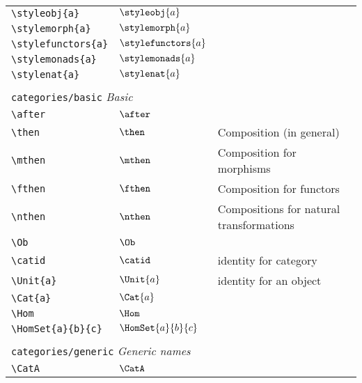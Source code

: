 \begin{longtable}{lll}
 \hline
{\color[rgb]{0.5,0.5,0.5}\texttt{\textbackslash styleobj\{a\}}} & $\styleobj{a}$ & \\ 
 {\color[rgb]{0.5,0.5,0.5}\texttt{\textbackslash stylemorph\{a\}}} & $\stylemorph{a}$ & \\ 
 {\color[rgb]{0.5,0.5,0.5}\texttt{\textbackslash stylefunctors\{a\}}} & $\stylefunctors{a}$ & \\ 
 {\color[rgb]{0.5,0.5,0.5}\texttt{\textbackslash stylemonads\{a\}}} & $\stylemonads{a}$ & \\ 
 {\color[rgb]{0.5,0.5,0.5}\texttt{\textbackslash stylenat\{a\}}} & $\stylenat{a}$ & \\ 
  &  & \\ 
 \multicolumn{3}{l}{{\color[rgb]{0.5,0.5,0.5}\texttt{categories/basic}} \emph{Basic}}\\ 
 \hline
{\color[rgb]{0.5,0.5,0.5}\texttt{\textbackslash after}} & $\after$ & \\ 
 {\color[rgb]{0.5,0.5,0.5}\texttt{\textbackslash then}} & $\then$ &  Composition (in general)\\ 
 {\color[rgb]{0.5,0.5,0.5}\texttt{\textbackslash mthen}} & $\mthen$ &  Composition for morphisms\\ 
 {\color[rgb]{0.5,0.5,0.5}\texttt{\textbackslash fthen}} & $\fthen$ &  Composition for functors\\ 
 {\color[rgb]{0.5,0.5,0.5}\texttt{\textbackslash nthen}} & $\nthen$ &  Compositions for natural transformations\\ 
 {\color[rgb]{0.5,0.5,0.5}\texttt{\textbackslash Ob}} & $\Ob$ & \\ 
 {\color[rgb]{0.5,0.5,0.5}\texttt{\textbackslash catid}} & $\catid$ &  identity for category\\ 
 {\color[rgb]{0.5,0.5,0.5}\texttt{\textbackslash Unit\{a\}}} & $\Unit{a}$ &  identity for an object\\ 
 {\color[rgb]{0.5,0.5,0.5}\texttt{\textbackslash Cat\{a\}}} & $\Cat{a}$ & \\ 
 {\color[rgb]{0.5,0.5,0.5}\texttt{\textbackslash Hom}} & $\Hom$ & \\ 
 {\color[rgb]{0.5,0.5,0.5}\texttt{\textbackslash HomSet\{a\}\{b\}\{c\}}} & $\HomSet{a}{b}{c}$ & \\ 
  &  & \\ 
 \multicolumn{3}{l}{{\color[rgb]{0.5,0.5,0.5}\texttt{categories/generic}} \emph{Generic names}}\\ 
 \hline
{\color[rgb]{0.5,0.5,0.5}\texttt{\textbackslash CatA}} & $\CatA$ & \\ 

\end{longtable}
